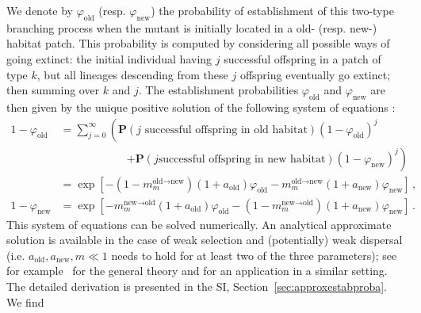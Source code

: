 \documentclass[11pt]{article}
\begin{document}
We denote by $\varphi_{\text{old}}$ (resp. $\varphi_{\text{new}}$) the probability of establishment of this two-type branching process when the mutant is initially located in a old- (resp. new-) habitat patch. This probability is computed by considering all possible ways of going extinct: the initial individual having $j$ successful offspring in a patch of type $k$, but all lineages descending from these $j$ offspring eventually go extinct; then summing over $k$ and $j$. The establishment probabilities $\varphi_{\text{old}}$ and $\varphi_{\text{new}}$ are then given by the unique positive solution of the following system of equations \citep[see][Chapters 5.3 and 5.6]{haccou_book}:
%
\begin{equation}\label{eq:ext_prob}
	\begin{aligned}
		1-\varphi_{\text{old}} &= \sum_{j=0}^{\infty}\left( \mathbf{P}(j \text{ successful offspring in old habitat})(1-\varphi_{\text{old}})^j \right. \\
		&\qquad \qquad \qquad \left.+ \mathbf{P}(j \text{successful offspring in new habitat})(1-\varphi_{\text{new}})^j\right)\\
		&=\exp\left[-\left(1-m^{\text{old}\to \text{new}}_m\right)(1+a_{\text{old}})\varphi_{\text{old}} - m^{\text{old}\to \text{new}}_m (1+a_{\text{new}}) \varphi_{\text{new}}\right]\, ,   \\
		1-\varphi_{\text{new}} &= \exp\left[-m^{\text{new}\to \text{old}}_m(1+a_{\text{old}})\varphi_{\text{old}} - \left(1-m^{\text{new}\to \text{old}}_m\right) (1+a_{\text{new}}) \varphi_{\text{new}}\right]\, .
	\end{aligned}
\end{equation}
This system of equations can be solved numerically. An analytical approximate solution is available in the case of weak selection and (potentially) weak dispersal (i.e. $a_{\text{old}},a_{\text{new}},m\ll 1$ needs to hold for at least two of the three parameters); see for example~\citet[Theorem~5.6]{haccou_book} for the general theory and \citet{tomasini_2018} for an application in a similar setting. The detailed derivation is presented in the SI, Section~\ref{sec:approxestabproba}. We find
\end{document}
